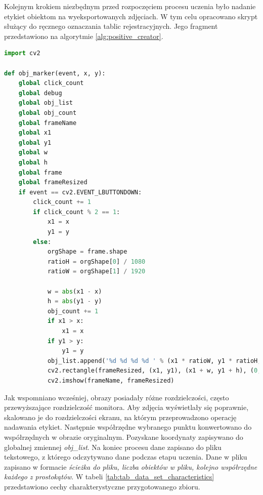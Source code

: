 Kolejnym krokiem niezbędnym przed rozpoczęciem procesu uczenia było nadanie etykiet obiektom na wyeksportowanych zdjęciach.
W tym celu opracowano skrypt służący do ręcznego oznaczania tablic rejestracyjnych.
Jego fragment przedstawiono na algorytmie \ref{alg:positive_creator}.
\begin{lstlisting}[language=Python, caption=Funkcja do oznaczania fragmentów obrazu zawierających poszukiwany obiekt, label=alg:positive_creator]
import cv2

def obj_marker(event, x, y):
    global click_count
    global debug
    global obj_list
    global obj_count
    global frameName
    global x1
    global y1
    global w
    global h
    global frame
    global frameResized
    if event == cv2.EVENT_LBUTTONDOWN:
        click_count += 1
        if click_count % 2 == 1:
            x1 = x
            y1 = y
        else:
            orgShape = frame.shape
            ratioH = orgShape[0] / 1080
            ratioW = orgShape[1] / 1920

            w = abs(x1 - x)
            h = abs(y1 - y)
            obj_count += 1
            if x1 > x:
                x1 = x
            if y1 > y:
                y1 = y
            obj_list.append('%d %d %d %d ' % (x1 * ratioW, y1 * ratioH, w * ratioW, h * ratioH))
            cv2.rectangle(frameResized, (x1, y1), (x1 + w, y1 + h), (0, 255, 0), 1)
            cv2.imshow(frameName, frameResized)
\end{lstlisting}
Jak wspomniano wcześniej, obrazy posiadały różne rozdzielczości, często przewyższające rozdzielczość monitora.
Aby zdjęcia wyświetlały się poprawnie, skalowano je do rozdzielczości ekranu, na którym przeprowadzono operację nadawania etykiet.
Następnie współrzędne wybranego punktu konwertowano do współrzędnych w obrazie oryginalnym.
Pozyskane koordynaty zapisywano do globalnej zmiennej \textit{obj\_list}.
Na koniec procesu dane zapisano do pliku tekstowego, z którego odczytywano dane podczas etapu uczenia.
Dane w pliku zapisano w formacie \textit{ścieżka do pliku, liczba obiektów w pliku, kolejno współrzędne każdego z prostokątów}.
W tabeli \ref{tab:tab_data_set_characteristics} przedstawiono cechy charakterystyczne przygotowanego zbioru.
